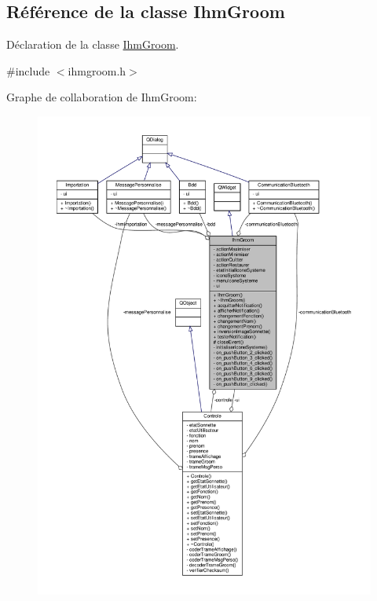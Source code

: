 \hypertarget{class_ihm_groom}{}\subsection{Référence de la classe Ihm\+Groom}
\label{class_ihm_groom}


Déclaration de la classe \hyperlink{class_ihm_groom}{Ihm\+Groom}.  




{\ttfamily \#include $<$ihmgroom.\+h$>$}



Graphe de collaboration de Ihm\+Groom\+:
\nopagebreak
\begin{figure}[H]
\begin{center}
\leavevmode
\includegraphics[width=350pt]{class_ihm_groom__coll__graph}
\end{center}
\end{figure}
